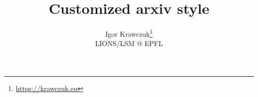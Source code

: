 \documentclass{article}
\title{Customized arxiv style}
\author{
    Igor Krawczuk\thanks{\url{https://krawczuk.eu}}\\
    LIONS/LSM @ EPFL
}
\begin{document}
\maketitle
\listoftodos

\begin{abstract}
\lipsum[1]
\end{abstract}







\printbibliography
\printglossaries
\end{document}
